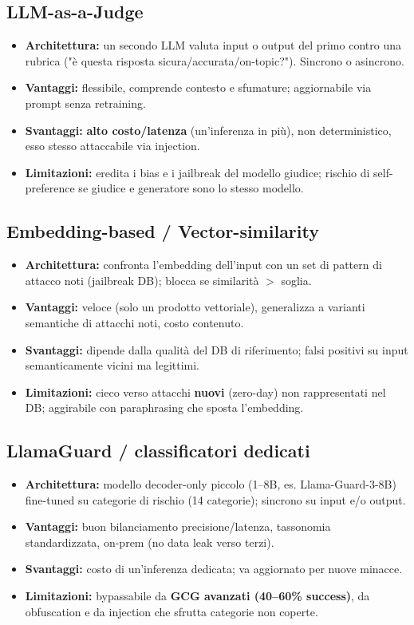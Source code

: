 \documentclass[11pt, a4paper]{article}
\begin{document}
\subsection{LLM-as-a-Judge}
\begin{itemize}[leftmargin=*]
    \item \textbf{Architettura:} un secondo LLM valuta input o output del primo contro una rubrica ("è questa risposta sicura/accurata/on-topic?"). Sincrono o asincrono.
    \item \textbf{Vantaggi:} flessibile, comprende contesto e sfumature; aggiornabile via prompt senza retraining.
    \item \textbf{Svantaggi:} \textbf{alto costo/latenza} (un'inferenza in più), non deterministico, esso stesso attaccabile via injection.
    \item \textbf{Limitazioni:} eredita i bias e i jailbreak del modello giudice; rischio di self-preference se giudice e generatore sono lo stesso modello.
\end{itemize}

\subsection{Embedding-based / Vector-similarity}
\begin{itemize}[leftmargin=*]
    \item \textbf{Architettura:} confronta l'embedding dell'input con un set di pattern di attacco noti (jailbreak DB); blocca se similarità $>$ soglia.
    \item \textbf{Vantaggi:} veloce (solo un prodotto vettoriale), generalizza a varianti semantiche di attacchi noti, costo contenuto.
    \item \textbf{Svantaggi:} dipende dalla qualità del DB di riferimento; falsi positivi su input semanticamente vicini ma legittimi.
    \item \textbf{Limitazioni:} cieco verso attacchi \textbf{nuovi} (zero-day) non rappresentati nel DB; aggirabile con paraphrasing che sposta l'embedding.
\end{itemize}

\subsection{LlamaGuard / classificatori dedicati}
\begin{itemize}[leftmargin=*]
    \item \textbf{Architettura:} modello decoder-only piccolo (1--8B, es. Llama-Guard-3-8B) fine-tuned su categorie di rischio (14 categorie); sincrono su input e/o output.
    \item \textbf{Vantaggi:} buon bilanciamento precisione/latenza, tassonomia standardizzata, on-prem (no data leak verso terzi).
    \item \textbf{Svantaggi:} costo di un'inferenza dedicata; va aggiornato per nuove minacce.
    \item \textbf{Limitazioni:} bypassabile da \textbf{GCG avanzati (40--60\% success)}, da obfuscation e da injection che sfrutta categorie non coperte.
\end{itemize}
\end{document}
